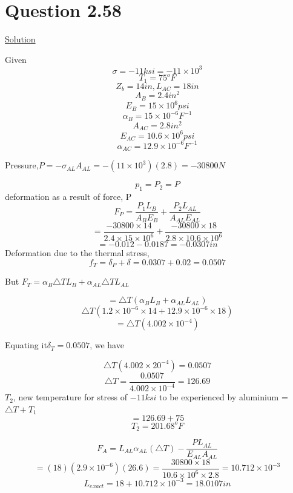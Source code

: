 \documentclass{article}
\begin{document}
\section*{Question 2.58}
\begin{center} \underline{Solution}\end{center}
Given \[\sigma = -11ksi = -11\times 10^{3}\]
\[T_{1} = 75^{o}F\]
\[Z_{b} = 14in, L_{AC} = 18in\]
\[A_{B} = 2.4in^{2}\]
\[E_{B} = 15\times10^{6}psi\]
\[\alpha_{B}=15\times10^{-6}F^{-1}\]
\[A_{AC} = 2.8in^{2}\]
\[E_{AC} = 10.6\times10^{6}psi\]
\[\alpha_{AC}=12.9\times10^{-6}F^{-1}\]
\begin{center}Pressure,$P = -\sigma_{AL}A_{AL}=- (11\times10^{3})(2.8) = -30800N$\end{center}
\[p_{1} = P_{2} = P\]
deformation as a result of force, P
\[F_{P} = \frac{P_{1}L_{B}}{A_{B}E_{B}} + \frac{P_{2}L_{AL}}{A_{AL}E_{AL}}\]
\[=\frac{-30800\times14}{2.4\times15\times10^{6}} + \frac{-30800\times18}{2.8\times10.6\times10^{6}}\]
\[=-0.012 - 0.0187 = -0.0307in\]
Deformation due to the thermal stress,
\[f_{T} = \delta_{P}+\delta = 0.0307 + 0.02 = 0.0507\]
\begin{center}But $F_{T} = \alpha_{B}\triangle T L_{B} +  \alpha_{AL}\triangle T L_{AL}$\end{center}
\[= \triangle T( \alpha_{B} L_{B} +  \alpha_{AL} L_{AL})\]
\[\triangle T(1.2\times 10^{-6}\times14 + 12.9\times10^{-6}\times18)\]
\[=\triangle T(4.002\times10^{-4})\]
\begin{center} Equating it$ \delta_{T} = 0.0507$, we have\end{center}
\[\triangle T(4.002\times20^{-4}) = 0.0507\]
\[\triangle T = \frac{0.0507}{4.002\times10^{-4}} = 126.69\]
$T_{2}$, new temperature for stress of $-11ksi$ to be experienced by aluminium = $\triangle T +T_{1}$
\[=126.69 + 75\]
\[T_{2} = 201.68^{o}F\]
\newline
\newline

\[F_{A} = L_{AL}\alpha_{AL}(\triangle T) - \frac{PL_{AL}}{E_{AL}A_{AL}}\]
\[=(18)(2.9\times10^{-6})(26.6) = \frac{30800\times 18}{10.6\times10^{6}\times2.8} = 10.712\times10^{-3}\]
\[L_{exact} = 18 + 10.712\times 10^{-3} = 18.0107in\]
\end{document}
